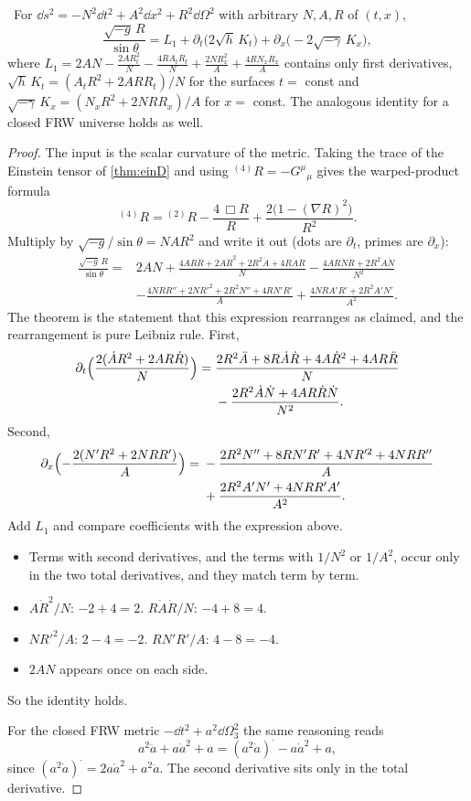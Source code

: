 \begin{theorem}\label{thm:ghy}\ver\
For $\dd s^2=-N^2\dd t^2+A^2\dd x^2+R^2\dd\Omega^2$ with arbitrary $N,A,R$ of $(t,x)$,
\[
\frac{\sqrt{-g}\,R}{\sin\theta}=L_1+\partial_t\bigl(2\sqrt h\,K_t\bigr)+\partial_x\bigl(-2\sqrt{-\gamma}\,K_x\bigr),
\]
where $L_1=2AN-\frac{2AR_t^2}{N}-\frac{4RA_tR_t}{N}+\frac{2NR_x^2}{A}+\frac{4RN_xR_x}{A}$ contains only first derivatives, $\sqrt h\,K_t=(A_tR^2+2ARR_t)/N$ for the surfaces $t=$ const and $\sqrt{-\gamma}\,K_x=(N_xR^2+2NRR_x)/A$ for $x=$ const. The analogous identity for a closed FRW universe holds as well.
\end{theorem}
\begin{proof}
The input is the scalar curvature of the metric. Taking the trace of the Einstein tensor of \cref{thm:einD} and using ${}^{(4)}\!R=-G^\mu{}_\mu$ gives the warped-product formula
\[
{}^{(4)}\!R={}^{(2)}\!R-\frac{4\,\Box R}{R}+\frac{2\bigl(1-(\nabla R)^2\bigr)}{R^2}.
\]
Multiply by $\sqrt{-g}/\sin\theta=NAR^2$ and write it out (dots are $\partial_t$, primes are $\partial_x$):
\[
\begin{aligned}
\frac{\sqrt{-g}\,R}{\sin\theta}={}&2AN+\frac{4AR\ddot R+2A\dot R^2+2R^2\ddot A+4R\dot A\dot R}{N}-\frac{4AR\dot N\dot R+2R^2\dot A\dot N}{N^2}\\
&-\frac{4NRR''+2NR'^2+2R^2N''+4RN'R'}{A}+\frac{4NRA'R'+2R^2A'N'}{A^2}.
\end{aligned}
\]
The theorem is the statement that this expression rearranges as claimed, and the rearrangement is pure Leibniz rule. First,
\[
\begin{aligned}
\partial_t\Bigl(\frac{2(\dot AR^2+2AR\dot R)}N\Bigr)={}&\frac{2R^2\ddot A+8R\dot A\dot R+4A\dot R^2+4AR\ddot R}{N}\\
&-\frac{2R^2\dot A\dot N+4AR\dot R\dot N}{N^2}.
\end{aligned}
\]
Second,
\[
\begin{aligned}
\partial_x\Bigl(-\frac{2(N'R^2+2NRR')}A\Bigr)={}&-\frac{2R^2N''+8RN'R'+4NR'^2+4NRR''}{A}\\
&+\frac{2R^2A'N'+4NRR'A'}{A^2}.
\end{aligned}
\]
Add $L_1$ and compare coefficients with the expression above.
\begin{itemize}[nosep]
\item Terms with second derivatives, and the terms with $1/N^2$ or $1/A^2$, occur only in the two total derivatives, and they match term by term.
\item $A\dot R^2/N$: $-2+4=2$. \quad $R\dot A\dot R/N$: $-4+8=4$.
\item $NR'^2/A$: $2-4=-2$. \quad $RN'R'/A$: $4-8=-4$.
\item $2AN$ appears once on each side.
\end{itemize}
So the identity holds.

For the closed FRW metric $-\dd t^2+a^2\dd\Omega_3^2$ the same reasoning reads
\[
a^2\ddot a+a\dot a^2+a=(a^2\dot a)^{\displaystyle\cdot}-a\dot a^2+a ,
\]
since $(a^2\dot a)^{\displaystyle\cdot}=2a\dot a^2+a^2\ddot a$. The second derivative sits only in the total derivative.
\end{proof}


